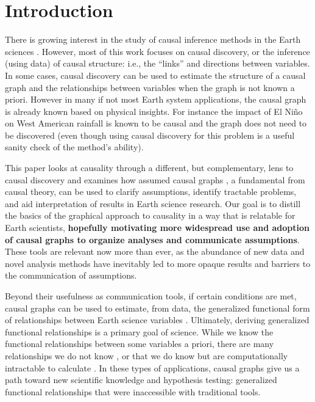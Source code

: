 \documentclass[12pt]{article}
\begin{document}
\section{Introduction}

There is growing interest in the study of causal inference methods in
the Earth sciences \citep[e.g.,][]{salvucci2002, ebert-uphoff2012,
  kretschmer2016,Green_2017,barnes-2019,
  samarasinghe2020,runge-causal-timeseries,runge2019inferring,goodwell-causality-2020}. However,
most of this work focuses on causal discovery, or the inference (using
data) of causal structure: i.e., the ``links'' and directions between
variables. In some cases, causal discovery can be used to estimate the
structure of a causal graph and the relationships between variables
when the graph is not known a priori. However in many if not most
Earth system applications, the causal graph is already known based on
physical insights. For instance the impact of El Ni\~{n}o on West
American rainfall is known to be causal and the graph does not need to
be discovered (even though using causal discovery for this problem is
a useful sanity check of the method's ability).

This paper looks at causality through a different, but complementary,
lens to causal discovery and examines how assumed causal graphs \citep{pearl1995causal}, a
fundamental from causal theory, can be used to clarify assumptions,
identify tractable problems, and aid interpretation of results in
Earth science research. Our goal is to distill
\citep[e.g.,][]{olah2017} the basics of the graphical approach to
causality in a way that is relatable for Earth scientists,
\textbf{hopefully motivating more widespread use and adoption of
  causal graphs to organize analyses and communicate
  assumptions}. These tools are relevant now more than ever, as the
abundance of new data and novel analysis methods have inevitably led
to more opaque results and barriers to the communication of
assumptions.

Beyond their usefulness as communication tools, if certain conditions
are met, causal graphs can be used to estimate, from data, the
generalized functional form of relationships between Earth science
variables \citep{pearl2009causality}. Ultimately, deriving generalized
functional relationships is a primary goal of science. While we know
the functional relationships between some variables a priori, there
are many relationships we do not know \citep[e.g., ecosystem scale
water and carbon fluxes;][]{massmann2019, zhou2019arid,
  zhou2019feedback, grossiord2020}, or that we do know but are
computationally intractable to calculate \citep[e.g., clouds and
microphysics at the global scale:][]{randall2003, gentine2018,
  zadra2018, gagne2020emulation}. In these types of applications,
causal graphs give us a path toward new scientific knowledge and
hypothesis testing: generalized functional relationships that were
inaccessible with traditional tools.
\end{document}
